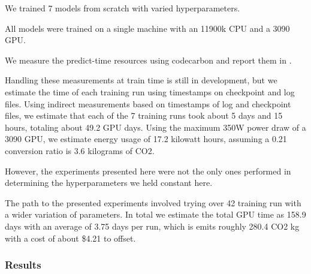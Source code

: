 \documentclass[10pt,twocolumn,letterpaper]{article}
\begin{document}
We trained 7 models from scratch with varied hyperparameters.

All models were trained on a single machine with an 11900k CPU and a 3090 GPU.

We measure the predict-time resources using codecarbon \cite{lacoste2019codecarbon} and report them in .

Handling these measurements at train time is still in development, but we
estimate the time of each training run using timestamps on checkpoint and log
files.  Using indirect measurements based on timestamps of log and checkpoint
files, we estimate that each of the 7 training runs took about 5 days and 15
hours, totaling about 49.2 GPU days. Using the maximum 350W power draw of a
3090 GPU, we estimate energy usage of 17.2 kilowatt hours, assuming a 0.21
conversion ratio is 3.6 kilograms of CO2.

\begin{comment}
import kwutil.util_units

reg = kwutil.util_units.unit_registry()
gpu_power = 350 * reg.watt
time = 49.2 * reg.hour

co2kg_per_kwh = 0.210
energy_usage = (gpu_power *  time).to(reg.kilowatt * reg.hour)

co2_kg = energy_usage.m * co2kg_per_kwh
print(f'{round(co2_kg, 1)} CO2 kg')

dollar_per_kg = 0.015

cost_to_offset = dollar_per_kg * co2_kg
print(f'cost_to_offset = ${cost_to_offset:4.2f}')
\end{comment}


However, the experiments presented here were not the only ones performed in
determining the hyperparameters we held constant here. 

The path to the presented experiments involved trying over 42 training run with
a wider variation of parameters. In total we estimate the total GPU time as
158.9 days with an average of 3.75 days per run, which is emits roughly 280.4
CO2 kg with a cost of about \$4.21 to offset.

\subsubsection{Results}
\end{document}
